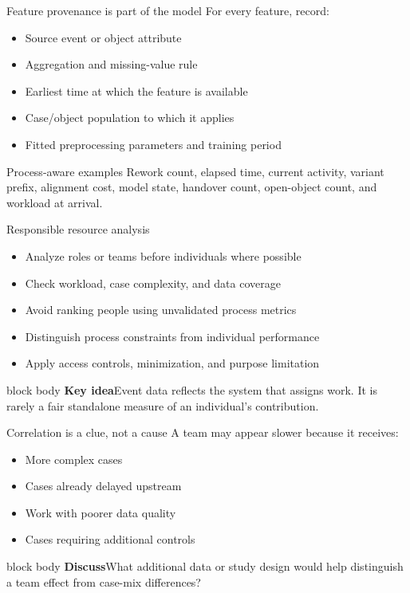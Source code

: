 \documentclass[aspectratio=169,11pt]{beamer}
\newcommand{\keyidea}[1]{%
  \begin{beamercolorbox}[rounded=true,sep=0.65em]{block body}
    \textbf{\color{Teal}Key idea}\quad #1
  \end{beamercolorbox}
}
\newcommand{\promptbox}[1]{%
  \begin{beamercolorbox}[rounded=true,sep=0.65em]{block body}
    \textbf{\color{Coral}Discuss}\quad #1
  \end{beamercolorbox}
}
\begin{document}
\begin{frame}{Feature provenance is part of the model}
  For every feature, record:
  \begin{itemize}
    \item Source event or object attribute
    \item Aggregation and missing-value rule
    \item Earliest time at which the feature is available
    \item Case/object population to which it applies
    \item Fitted preprocessing parameters and training period
  \end{itemize}
  \vspace{0.35cm}
  \begin{block}{Process-aware examples}
    Rework count, elapsed time, current activity, variant prefix, alignment cost,
    model state, handover count, open-object count, and workload at arrival.
  \end{block}
\end{frame}

\begin{frame}{Responsible resource analysis}
  \begin{itemize}
    \item Analyze roles or teams before individuals where possible
    \item Check workload, case complexity, and data coverage
    \item Avoid ranking people using unvalidated process metrics
    \item Distinguish process constraints from individual performance
    \item Apply access controls, minimization, and purpose limitation
  \end{itemize}
  \vspace{0.45cm}
  \keyidea{Event data reflects the system that assigns work. It is rarely a fair
  standalone measure of an individual's contribution.}
\end{frame}

\begin{frame}{Correlation is a clue, not a cause}
  A team may appear slower because it receives:
  \begin{itemize}
    \item More complex cases
    \item Cases already delayed upstream
    \item Work with poorer data quality
    \item Cases requiring additional controls
  \end{itemize}
  \vspace{0.35cm}
  \promptbox{What additional data or study design would help distinguish a team
  effect from case-mix differences?}
\end{frame}
\end{document}
